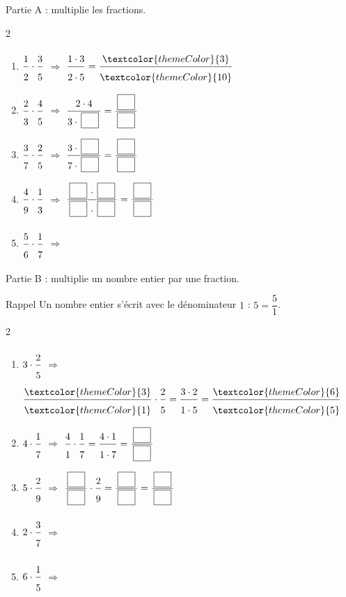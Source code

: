 \newpage
{}

\medskip
\textcolor{themeColor}{Partie A} : multiplie les fractions.

\begin{multicols}{2}
\begin{enumerate}[leftmargin=*,align=parleft, label=\alph*), itemsep=2pt]
\item $\FA{1}{2}\cdot\FA{3}{5}$ \quad $\Longrightarrow$ \quad $\FA{1 \cdot 3}{2 \cdot 5}=\FA{\textcolor{themeColor}{3}}{\textcolor{themeColor}{10}}$
\item $\FA{2}{3}\cdot\FA{4}{5}$ \quad $\Longrightarrow$ \quad $\FA{2 \cdot 4}{3 \cdot \CaseC}=\FA{\CaseC}{\CaseC}$
\item $\FA{3}{7}\cdot\FA{2}{5}$ \quad $\Longrightarrow$ \quad $\FA{3 \cdot \CaseC}{7 \cdot \CaseC}=\FA{\CaseC}{\CaseC}$
\item $\FA{4}{9}\cdot\FA{1}{3}$ \quad $\Longrightarrow$ \quad $\FA{\CaseC \cdot \CaseC}{\CaseC \cdot \CaseC}=\FA{\CaseC}{\CaseC}$
\item $\FA{5}{6}\cdot\FA{1}{7}$ \quad $\Longrightarrow$
\end{enumerate}
\end{multicols}

\vfill
\textcolor{themeColor}{Partie B} : multiplie un nombre entier par une fraction.

\begin{astuce}{Rappel}
Un nombre entier s'écrit avec le dénominateur $1$ : $5=\dfrac{5}{1}$.
\end{astuce}

\begin{multicols}{2}
\begin{enumerate}[leftmargin=*,align=parleft, label=\alph*), itemsep=2pt, start=6]
\item $3\cdot\FA{2}{5}$ \quad $\Longrightarrow$ \quad $\FA{\textcolor{themeColor}{3}}{\textcolor{themeColor}{1}}\cdot\FA{2}{5}=\FA{3 \cdot 2}{1 \cdot 5}=\FA{\textcolor{themeColor}{6}}{\textcolor{themeColor}{5}}$
\item $4\cdot\FA{1}{7}$ \quad $\Longrightarrow$ \quad $\FA{4}{1}\cdot\FA{1}{7}=\FA{4 \cdot 1}{1 \cdot 7}=\FA{\CaseC}{\CaseC}$
\item $5\cdot\FA{2}{9}$ \quad $\Longrightarrow$ \quad $\FA{\CaseC}{\CaseC}\cdot\FA{2}{9}=\FA{\CaseC}{\CaseC}=\FA{\CaseC}{\CaseC}$
\item $2\cdot\FA{3}{7}$ \quad $\Longrightarrow$
\item $6\cdot\FA{1}{5}$ \quad $\Longrightarrow$
\end{enumerate}
\end{multicols}

